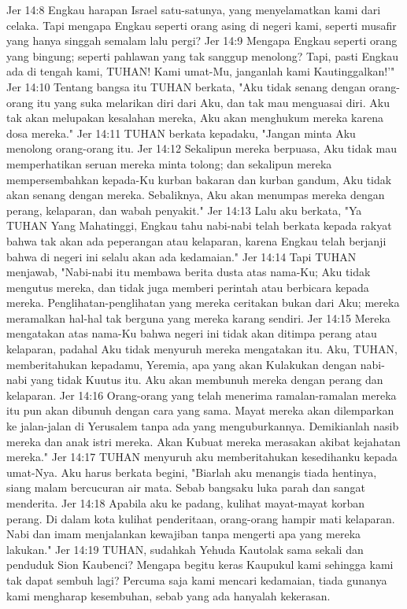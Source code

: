 Jer 14:8  Engkau harapan Israel satu-satunya, yang menyelamatkan kami dari celaka. Tapi mengapa Engkau seperti orang asing di negeri kami, seperti musafir yang hanya singgah semalam lalu pergi?
Jer 14:9  Mengapa Engkau seperti orang yang bingung; seperti pahlawan yang tak sanggup menolong? Tapi, pasti Engkau ada di tengah kami, TUHAN! Kami umat-Mu, janganlah kami Kautinggalkan!'"
Jer 14:10  Tentang bangsa itu TUHAN berkata, "Aku tidak senang dengan orang-orang itu yang suka melarikan diri dari Aku, dan tak mau menguasai diri. Aku tak akan melupakan kesalahan mereka, Aku akan menghukum mereka karena dosa mereka."
Jer 14:11  TUHAN berkata kepadaku, "Jangan minta Aku menolong orang-orang itu.
Jer 14:12  Sekalipun mereka berpuasa, Aku tidak mau memperhatikan seruan mereka minta tolong; dan sekalipun mereka mempersembahkan kepada-Ku kurban bakaran dan kurban gandum, Aku tidak akan senang dengan mereka. Sebaliknya, Aku akan menumpas mereka dengan perang, kelaparan, dan wabah penyakit."
Jer 14:13  Lalu aku berkata, "Ya TUHAN Yang Mahatinggi, Engkau tahu nabi-nabi telah berkata kepada rakyat bahwa tak akan ada peperangan atau kelaparan, karena Engkau telah berjanji bahwa di negeri ini selalu akan ada kedamaian."
Jer 14:14  Tapi TUHAN menjawab, "Nabi-nabi itu membawa berita dusta atas nama-Ku; Aku tidak mengutus mereka, dan tidak juga memberi perintah atau berbicara kepada mereka. Penglihatan-penglihatan yang mereka ceritakan bukan dari Aku; mereka meramalkan hal-hal tak berguna yang mereka karang sendiri.
Jer 14:15  Mereka mengatakan atas nama-Ku bahwa negeri ini tidak akan ditimpa perang atau kelaparan, padahal Aku tidak menyuruh mereka mengatakan itu. Aku, TUHAN, memberitahukan kepadamu, Yeremia, apa yang akan Kulakukan dengan nabi-nabi yang tidak Kuutus itu. Aku akan membunuh mereka dengan perang dan kelaparan.
Jer 14:16  Orang-orang yang telah menerima ramalan-ramalan mereka itu pun akan dibunuh dengan cara yang sama. Mayat mereka akan dilemparkan ke jalan-jalan di Yerusalem tanpa ada yang menguburkannya. Demikianlah nasib mereka dan anak istri mereka. Akan Kubuat mereka merasakan akibat kejahatan mereka."
Jer 14:17  TUHAN menyuruh aku memberitahukan kesedihanku kepada umat-Nya. Aku harus berkata begini, "Biarlah aku menangis tiada hentinya, siang malam bercucuran air mata. Sebab bangsaku luka parah dan sangat menderita.
Jer 14:18  Apabila aku ke padang, kulihat mayat-mayat korban perang. Di dalam kota kulihat penderitaan, orang-orang hampir mati kelaparan. Nabi dan imam menjalankan kewajiban tanpa mengerti apa yang mereka lakukan."
Jer 14:19  TUHAN, sudahkah Yehuda Kautolak sama sekali dan penduduk Sion Kaubenci? Mengapa begitu keras Kaupukul kami sehingga kami tak dapat sembuh lagi? Percuma saja kami mencari kedamaian, tiada gunanya kami mengharap kesembuhan, sebab yang ada hanyalah kekerasan.
